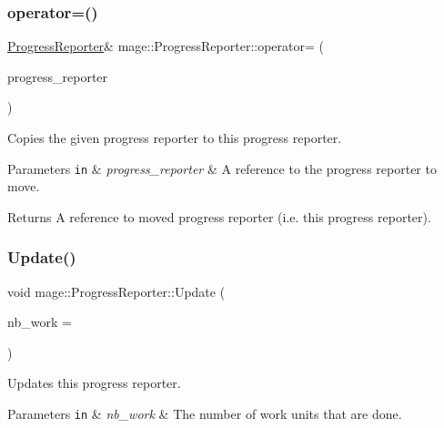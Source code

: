 \subsubsection{\texorpdfstring{operator=()}{operator=()}\hspace{0.1cm}{\footnotesize\ttfamily [2/2]}}
{\footnotesize\ttfamily \hyperlink{classmage_1_1_progress_reporter}{Progress\+Reporter}\& mage\+::\+Progress\+Reporter\+::operator= (\begin{DoxyParamCaption}\item[{\hyperlink{classmage_1_1_progress_reporter}{Progress\+Reporter} \&\&}]{progress\+\_\+reporter }\end{DoxyParamCaption})\hspace{0.3cm}{\ttfamily [delete]}}

Copies the given progress reporter to this progress reporter.


\begin{DoxyParams}[1]{Parameters}
\mbox{\tt in}  & {\em progress\+\_\+reporter} & A reference to the progress reporter to move. \\
\hline
\end{DoxyParams}
\begin{DoxyReturn}{Returns}
A reference to moved progress reporter (i.\+e. this progress reporter). 
\end{DoxyReturn}
\hypertarget{classmage_1_1_progress_reporter_a0975a0706d03f0f8d8119d64bc480ba0}{}\label{classmage_1_1_progress_reporter_a0975a0706d03f0f8d8119d64bc480ba0} 
\subsubsection{\texorpdfstring{Update()}{Update()}}
{\footnotesize\ttfamily void mage\+::\+Progress\+Reporter\+::\+Update (\begin{DoxyParamCaption}\item[{\hyperlink{namespacemage_af2b398bf98eb10351f49cad73fe2cc73}{u32}}]{nb\+\_\+work = {} }\end{DoxyParamCaption})}

Updates this progress reporter.


\begin{DoxyParams}[1]{Parameters}
\mbox{\tt in}  & {\em nb\+\_\+work} & The number of work units that are done. \\
\hline
\end{DoxyParams}


